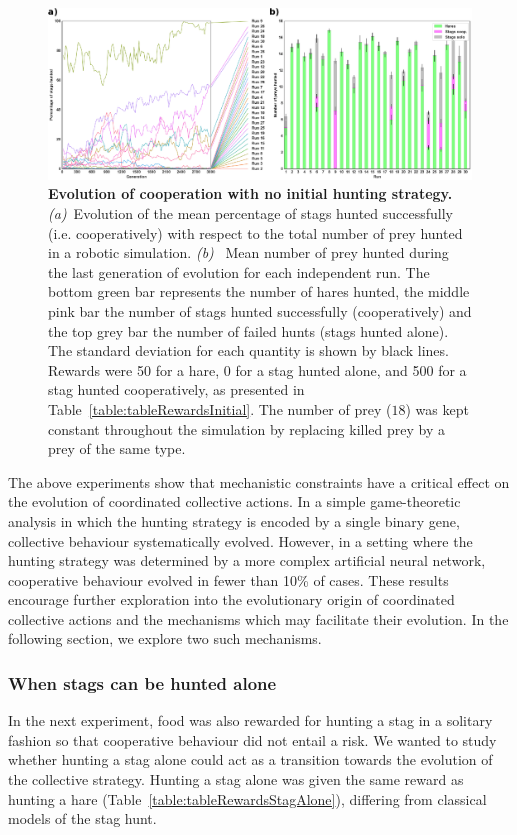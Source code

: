       \begin{figure}[hbtp]
        \centering
          \includegraphics[scale = 1]{fig/ArticleBio1/Fig5.eps}
        \caption{\textbf{Evolution of cooperation with no initial hunting strategy.} 
        {\em (a)}~Evolution of the mean percentage of stags hunted successfully (i.e. cooperatively) with respect to the total number of prey hunted in a robotic simulation. {\em (b)}~ Mean number of prey hunted during the last generation of evolution for each independent run. The bottom green bar represents the number of hares hunted, the middle pink bar the number of stags hunted successfully (cooperatively) and the top grey bar the number of failed hunts (stags hunted alone). The standard deviation for each quantity is shown by black lines. Rewards were 50 for a hare, 0 for a stag hunted alone, and 500 for a stag hunted cooperatively, as presented in Table~\ref{table:tableRewardsInitial}. The number of prey ($18$) was kept constant throughout the simulation by replacing killed prey by a prey of the same type.}
        \label{fig:initialRandom}
      \end{figure}

      The above experiments show that mechanistic constraints have a critical effect on the evolution of coordinated collective actions. In a simple game-theoretic analysis in which the hunting strategy is encoded by a single binary gene, collective behaviour systematically evolved. However, in a setting where the hunting strategy was determined by a more complex artificial neural network, cooperative behaviour evolved in fewer than 10\% of cases. These results encourage further exploration into the evolutionary origin of coordinated collective actions and the mechanisms which may facilitate their evolution. In the following section, we explore two such mechanisms.


    \subsubsection{When stags can be hunted alone}
    \label{successfulCooperation}
      In the next experiment, food was also rewarded for hunting a stag in a solitary fashion so that cooperative behaviour did not entail a risk. We wanted to study whether hunting a stag alone could act as a transition towards the evolution of the collective strategy. Hunting a stag alone was given the same reward as hunting a hare (Table~\ref{table:tableRewardsStagAlone}), differing from classical models of the stag hunt.

